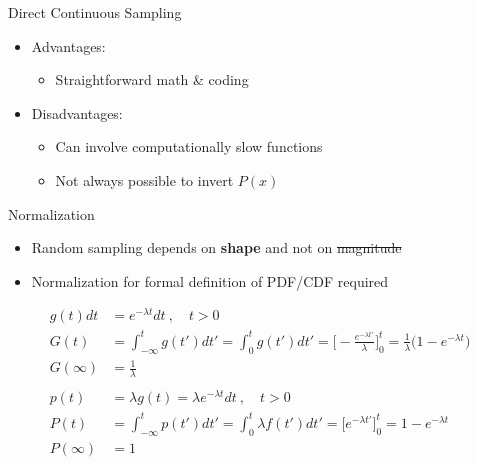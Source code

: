 \documentclass[xcolor=x11names,compress,handout]{beamer}
\renewcommand{\(}{\begin{columns}}
\renewcommand{\)}{\end{columns}}
\newcommand{\<}[1]{\begin{column}{#1}}
\renewcommand{\>}{\end{column}}
\begin{document}
\begin{frame}{Direct Continuous Sampling}

    \begin{itemize}
    \item Advantages: 
      \begin{itemize}
      \item Straightforward math \& coding
      \end{itemize}
    \vspace*{1 em}
    \item Disadvantages:
      \begin{itemize}
      \item Can involve computationally slow functions
      \item Not always possible to invert $P(x)$
      \end{itemize}
    \end{itemize}
    
\end{frame}


\begin{frame}{Normalization}

    \begin{itemize}
    \item Random sampling depends on \textbf{shape} and not on \sout{magnitude}
    \item Normalization for formal definition of PDF/CDF
required
    \end{itemize}
%
\[
  \begin{aligned}
g(t)dt &= e^{-\lambda t} dt \:, \quad t > 0 \\
G(t) &= \int_{-\infty}^t g(t')dt' = \int_0^t g(t') dt' = \biggl[- \frac{e^{-\lambda t'}}{\lambda} \biggr]_0^t = \frac{1}{\lambda} \bigl(1 - e^{-\lambda t}\bigr)\\
    G(\infty) &= \frac{1}{\lambda}\\
\\p(t) &= \lambda g(t) = \lambda e^{-\lambda t} dt \:, \quad t > 0 \\
    P(t) &= \int_{-\infty}^t p(t')dt' = \int_0^t \lambda f(t') dt' = \bigl[e^{-\lambda t'} \bigr]_0^t = 1 - e^{-\lambda t}\\
    P(\infty) &= 1
  \end{aligned}
\]    
    
\end{frame}
\end{document}
